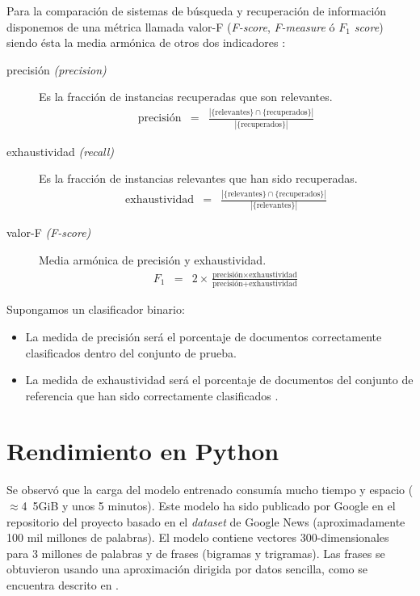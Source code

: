 Para la comparación de sistemas de búsqueda y recuperación de información disponemos de una métrica llamada valor-F (\emph{F-score}, \emph{F-measure} ó \emph{$F_1$ score}) siendo ésta la media armónica de otros dos indicadores \citep[Precisión y exhaustividad]{wikipedia-es}:
\begin{description}
\item[precisión \emph{(precision)}] 
Es la fracción de instancias recuperadas que son relevantes.
\begin{eqnarray}
\text{precisión} &=& \frac{|\{\text{relevantes}\}\cap\{\text{recuperados}\}|}{|\{\text{recuperados}\}|}
\end{eqnarray}
\item[exhaustividad \emph{(recall)}] 
Es la fracción de instancias relevantes que han sido recuperadas.
\begin{eqnarray}
\text{exhaustividad} &=& \frac{|\{\text{relevantes}\}\cap\{\text{recuperados}\}|}{|\{\text{relevantes}\}|}
\end{eqnarray}
\item[valor-F \emph{(F-score)}] Media armónica de precisión y exhaustividad.
\begin{eqnarray}
F_1 &=& 2\times\frac{\text{precisión}\times\text{exhaustividad}}{\text{precisión}+\text{exhaustividad}}
\end{eqnarray}
\end{description}

Supongamos un clasificador binario:
\begin{itemize}
\item La medida de precisión será el porcentaje de documentos correctamente clasificados dentro del conjunto de prueba.
\item La medida de exhaustividad será el porcentaje de documentos del conjunto de referencia que han sido correctamente clasificados \citep{Perkins2010}.
\end{itemize}


\section{Rendimiento en Python}

Se observó que la carga del modelo entrenado  consumía mucho tiempo y espacio ($\approx$\si{4.5}{GiB} y unos 5 minutos). Este modelo ha sido publicado por Google en el repositorio del proyecto  basado en el \emph{dataset} de Google News (aproximadamente 100 mil millones de palabras). El modelo contiene vectores 300-dimensionales para 3 millones de palabras y de frases (bigramas y trigramas). Las frases se obtuvieron usando una aproximación dirigida por datos sencilla, como se encuentra descrito en \cite{DBLP:journals/corr/MikolovSCCD13}.


